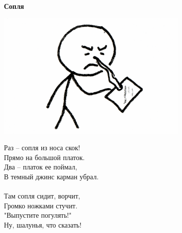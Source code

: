 \vspace*{\fill}
\begin{center}
  {\huge\textbf{Сопля}}

  \vspace{1.5em}  \includegraphics[width=0.7\textwidth]{pictures/soplya.png}
  \vspace{4em}
  \parbox{0.6\textwidth}{
    \LARGE
    \begin{spacing}{1.2}
      Раз – сопля из носа скок!\\
      Прямо на большой платок.\\
      Два – платок ее поймал,\\
      В темный джинс карман убрал.\\
      \\
      Там сопля сидит, ворчит,\\
      Громко ножками стучит.\\
      "Выпустите погулять!"\\
      Ну, шалунья, что сказать! %
    \end{spacing}
      
  }
\end{center}
\vspace*{\fill}